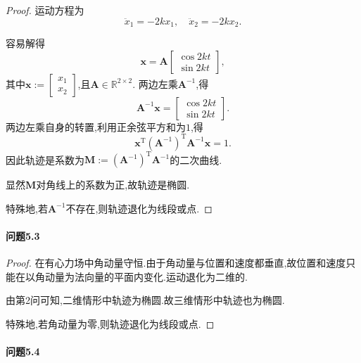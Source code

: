 \documentclass{article}
\newcommand{\nstars}[1]{\multido{}{#1}{$\star$}}
\begin{document}
\begin{proof}

运动方程为
$$\ddot x_1=-2kx_1,\quad\ddot x_2=-2kx_2.$$

容易解得
$$\mathbf x=\mathbf A\left[\begin{matrix}\cos2kt\\\sin2kt\end{matrix}\right],$$
其中$\mathbf x:=\left[\begin{matrix}x_1\\x_2\end{matrix}\right]$,且$\mathbf A\in\mathbb R^{2\times2}$.
两边左乘$\mathbf A^{-1}$,得
$$\mathbf A^{-1}\mathbf x=\left[\begin{matrix}\cos2kt\\\sin2kt\end{matrix}\right].$$
两边左乘自身的转置,利用正余弦平方和为$1$,得
$$\mathbf x^{\mathrm T}\left(\mathbf A^{-1}\right)^\mathrm T\mathbf A^{-1}\mathbf x=1.$$
因此轨迹是系数为$\mathbf M:=\left(\mathbf A^{-1}\right)^\mathrm T\mathbf A^{-1}$的二次曲线.

显然$\mathbf M$对角线上的系数为正,故轨迹是椭圆.

特殊地,若$\mathbf A^{-1}$不存在,则轨迹退化为线段或点.

\end{proof}

\paragraph{问题5.3}\nstars{1}

\begin{proof}

在有心力场中角动量守恒.由于角动量与位置和速度都垂直,故位置和速度只能在以角动量为法向量的平面内变化.运动退化为二维的.

由第2问可知,二维情形中轨迹为椭圆.故三维情形中轨迹也为椭圆.

特殊地,若角动量为零,则轨迹退化为线段或点.

\end{proof}

\paragraph{问题5.4}\nstars{3}
\end{document}
